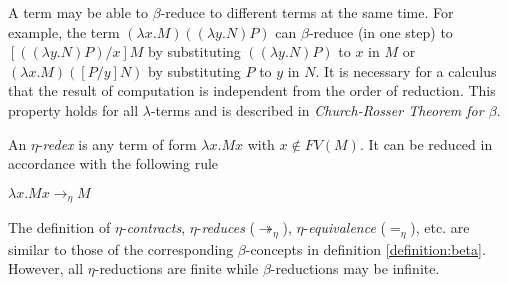 A term may be able to $ \beta $-reduce to different terms at the same time. For example, the term $ (\lambda x.M)((\lambda y.N)P) $ can $ \beta $-reduce (in one step) to $ [((\lambda y.N)P)/x]M $ by substituting $ ((\lambda y.N)P) $ to $ x $ in $ M $ or $ (\lambda x.M)([P/y]N) $ by substituting $ P $ to $ y $ in $ N $. It is necessary for a calculus that the result of computation is independent from the order of reduction. This property holds for all $ \lambda $-terms and is described in \emph{Church-Rosser Theorem for $ \beta $}.
\mbox\\
\begin{definition}
\label{definition:eta}
An $ \eta $-\emph{redex} is any term of form  $ \lambda x.Mx $ with $ x \not\in FV(M) $. It can be reduced in accordance with the following rule
\begin{center}
$ \lambda x.Mx \to _\eta M $
\end{center}
The definition of $ \eta $-\emph{contracts}, $ \eta $-\emph{reduces} ($ \twoheadrightarrow _\eta $), $ \eta $-\emph{equivalence} ($ =_\eta $), etc. are similar to those of the corresponding $ \beta $-concepts in definition \ref{definition:beta}. However, all $ \eta $-reductions are finite while $ \beta $-reductions may be infinite.
\end{definition}

